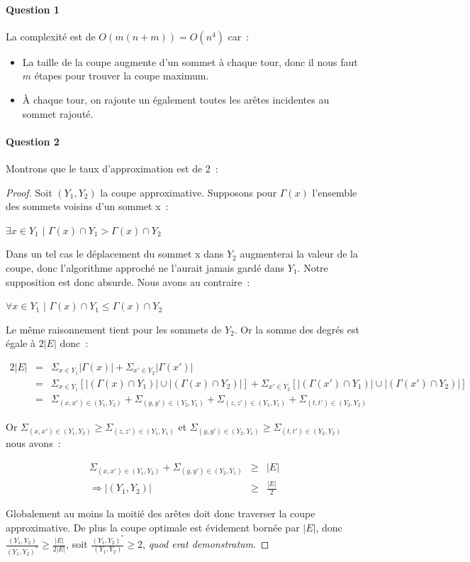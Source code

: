 \paragraph{Question 1}
La complexité est de $O(m(n+m))=O(n^4)$ car~:
\begin{itemize}
\item La taille de la coupe augmente d'un sommet à chaque tour, donc
il nous faut $m$ étapes pour trouver la coupe maximum.
\item À chaque tour, on rajoute un également toutes les arêtes
incidentes au sommet rajouté.
\end{itemize}

\paragraph{Question 2}
Montrons que le taux d'approximation est de 2~:
\begin{proof}Soit $(Y_1,Y_2)$ la coupe approximative. Supposons pour $\Gamma(x)$ l'ensemble des sommets voisins d'un sommet x~:

$\exists x \in Y_1 \text{ | } \Gamma(x) \cap Y_1 > \Gamma(x) \cap Y_2$

Dans un tel cas le déplacement du sommet x dans $Y_2$ augmenterai la valeur de la coupe, donc l'algorithme approché ne l'aurait jamais gardé dans $Y_1$. Notre supposition est donc absurde. Nous avons au contraire~:

$\forall x \in Y_1 \text{ | } \Gamma(x) \cap Y_1 \leq \Gamma(x) \cap Y_2$

Le même raisonnement tient pour les sommets de $Y_2$. Or la somme des degrés est égale à $2|E|$ donc~:

\begin{eqnarray*}
2|E| &=& \Sigma_{x \in Y_1}|\Gamma(x)|  + \Sigma_{x' \in Y_2}|\Gamma(x')| \\
	 &=& \Sigma_{x \in Y_1}[|(\Gamma(x)\cap{} Y_1)|\cup|(\Gamma(x)\cap{}Y_2)|] +
	 	 \Sigma_{x' \in Y_2}[|(\Gamma(x')\cap{} Y_1)|\cup|(\Gamma(x')\cap{}Y_2)|] \\
	 &=& \Sigma_{(x,x') \in (Y_1,Y_2)} +
	 	 \Sigma_{(y,y') \in (Y_2,Y_1)} + 
	 	 \Sigma_{(z,z') \in (Y_1,Y_1)} +
	 	 \Sigma_{(t,t') \in (Y_2,Y_2)} 
\end{eqnarray*}

Or $\Sigma_{(x,x') \in (Y_1,Y_2)} \geq \Sigma_{(z,z') \in (Y_1,Y_1)}$ et $\Sigma_{(y,y') \in (Y_2,Y_1)} \geq \Sigma_{(t,t') \in (Y_2,Y_2)}$ nous avons~:

\begin{eqnarray*}
\Sigma_{(x,x') \in (Y_1,Y_2)} + \Sigma_{(y,y') \in (Y_2,Y_1)} &\geq& |E| \\
\Rightarrow |(Y_1, Y_2)| &\geq& \frac{|E|}{2}
\end{eqnarray*}

Globalement au moins la moitié des arêtes doit donc traverser la coupe
approximative. De plus la coupe optimale est évidement bornée par
$|E|$, donc $\frac{(Y_1,Y_2)}{(Y_1,Y_2)^*} \geq \frac{|E|}{2|E|}$,
soit $\frac{(Y_1,Y_2)^*}{(Y_1,Y_2)} \geq 2$, \emph{quod erat
demonstratum}.
\end{proof}

